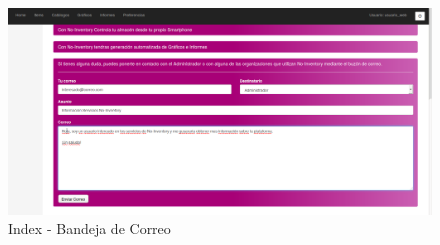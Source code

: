 \documentclass[a4paper,11pt]{book}
\begin{document}
\begin{figure}[H] 
\centering 
\includegraphics[scale=0.25]{imagenes/pruebas/correo.png}
\caption{ Index - Bandeja de Correo\cite{propio}}
\end{figure}
\end{document}
